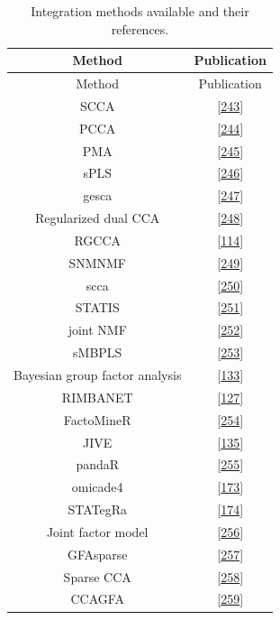 \documentclass[
  12pt,
  a4paper,
  twoside,
  openright]{book}
\begin{document}
\begin{longtable}[]{@{}cc@{}}
\caption{\label{tab:appendix-methods} Integration methods available and their references.}\tabularnewline
\toprule
Method & Publication \\
\midrule
\endfirsthead
\toprule
Method & Publication \\
\midrule
\endhead
SCCA & {[}\protect\hyperlink{ref-parkhomenko2009}{243}{]} \\
PCCA & {[}\protect\hyperlink{ref-waaijenborg2008}{244}{]} \\
PMA & {[}\protect\hyperlink{ref-witten2009}{245}{]} \\
sPLS & {[}\protect\hyperlink{ref-luxeacao2009}{246}{]} \\
gesca & {[}\protect\hyperlink{ref-hwang2009}{247}{]} \\
Regularized dual CCA & {[}\protect\hyperlink{ref-soneson2010}{248}{]} \\
RGCCA & {[}\protect\hyperlink{ref-tenenhaus_regularized_2011}{114}{]} \\
SNMNMF & {[}\protect\hyperlink{ref-zhang2011}{249}{]} \\
scca & {[}\protect\hyperlink{ref-lee2011}{250}{]} \\
STATIS & {[}\protect\hyperlink{ref-abdi2012}{251}{]} \\
joint NMF & {[}\protect\hyperlink{ref-zhang2012}{252}{]} \\
sMBPLS & {[}\protect\hyperlink{ref-li2012}{253}{]} \\
Bayesian group factor analysis & {[}\protect\hyperlink{ref-virtanen2012}{133}{]} \\
RIMBANET & {[}\protect\hyperlink{ref-zhu2012}{127}{]} \\
FactoMineR & {[}\protect\hyperlink{ref-abdi2013}{254}{]} \\
JIVE & {[}\protect\hyperlink{ref-lock2013a}{135}{]} \\
pandaR & {[}\protect\hyperlink{ref-schlauch2017}{255}{]} \\
omicade4 & {[}\protect\hyperlink{ref-meng2014}{173}{]} \\
STATegRa & {[}\protect\hyperlink{ref-planell2021}{174}{]} \\
Joint factor model & {[}\protect\hyperlink{ref-ray2014}{256}{]} \\
GFAsparse & {[}\protect\hyperlink{ref-bunte2016}{257}{]} \\
Sparse CCA & {[}\protect\hyperlink{ref-chen2013}{258}{]} \\
CCAGFA & {[}\protect\hyperlink{ref-leppuxe4aho2017}{259}{]} \\

\end{longtable}
\end{document}
